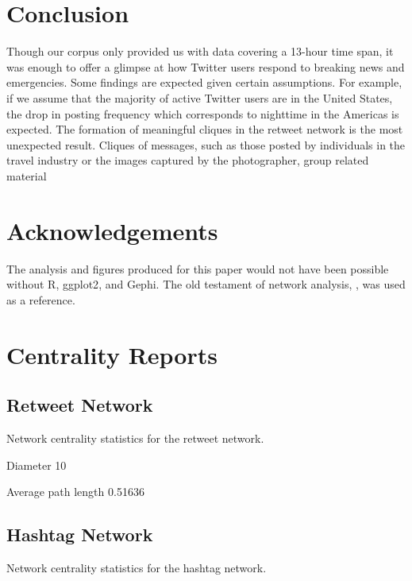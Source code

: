 \documentclass[a4paper, 11pt, titlepage]{article}
\begin{document}


\section{Conclusion}
Though our corpus only provided us with data covering a 13-hour time span, it was enough to offer a glimpse at how Twitter users respond to breaking news and emergencies.  Some findings are expected given certain assumptions.  For example, if we assume that the majority of active Twitter users are in the United States, the drop in posting frequency which corresponds to nighttime in the Americas is expected.  The formation of meaningful cliques in the retweet network is the most unexpected result.  Cliques of messages, such as those posted by individuals in the travel industry or the images captured by the photographer, group related material

\section{Acknowledgements}

The analysis and figures produced for this paper would not have been possible without R\cite{R}, ggplot2\cite{wickham2008ggplot2, wickham2009ggplot2}, and Gephi\cite{bastian2009gephi}.
The old testament of network analysis, \cite{wasserman1994sna}, was used as a reference.




\appendix
\section{Centrality Reports}
\subsection{Retweet Network}
Network centrality statistics for the retweet network.

\begin{description}
  \item{Diameter} 10
  \item{Average path length} 0.51636
\end{description}

\subsection{Hashtag Network}
Network centrality statistics for the hashtag network.
\end{document}
